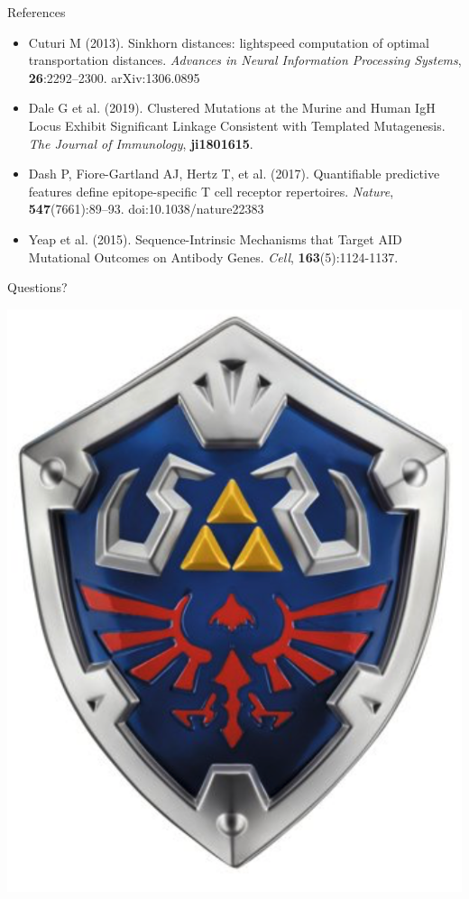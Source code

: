 \documentclass[mathserif,compress,xcolor={dvipsnames}]{beamer}
\renewcommand\;{\,}
\begin{document}
\begin{frame}{References}
\small
\begin{itemize}
\item[]
Cuturi M (2013). Sinkhorn distances: lightspeed computation of optimal transportation distances. {\em Advances in Neural Information Processing Systems}, \textbf{26}:2292--2300. arXiv:1306.0895
\bigskip
\item[]
Dale G et al. (2019). Clustered Mutations at the Murine and Human IgH Locus Exhibit Significant Linkage Consistent with Templated Mutagenesis. {\it The Journal of Immunology}, \textbf{ ji1801615}.
\bigskip
\item[]
Dash P, Fiore-Gartland AJ, Hertz T, et al. (2017). Quantifiable predictive features define epitope-specific T cell receptor repertoires. {\em Nature}, \textbf{547}(7661):89--93. doi:10.1038/nature22383
\bigskip
\item[]
Yeap et al. (2015). Sequence-Intrinsic Mechanisms that Target AID Mutational Outcomes on Antibody Genes. {\em Cell}, \textbf{163}(5):1124-1137. 
\end{itemize}
\end{frame}

\begin{frame}
\begin{center}
\Huge
Questions?
\end{center}
\end{frame}

\begin{frame}
\begin{center}
\includegraphics[width=0.5\linewidth]{Images/shield.png}
\end{center}
\end{frame}
\end{document}
